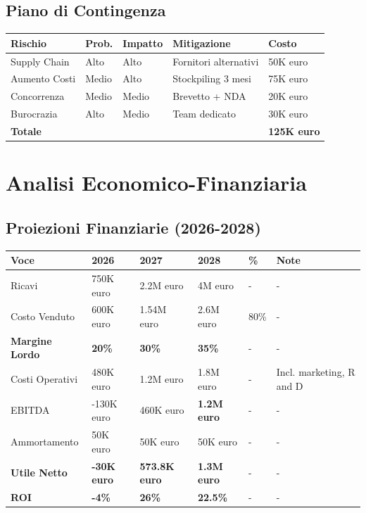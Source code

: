 \documentclass[11pt,a4paper]{report}
\begin{document}
\section{Piano di Contingenza}
\begin{longtable}{|L{3cm}|C{1.5cm}|C{1.5cm}|L{3.5cm}|C{1.5cm}|}
\hline
{\bf Rischio} & {\bf Prob.} & {\bf Impatto} & {\bf Mitigazione} & {\bf Costo} \\ \hline
Supply Chain & Alto & Alto & Fornitori alternativi & 50K euro \\
Aumento Costi & Medio & Alto & Stockpiling 3 mesi & 75K euro \\
Concorrenza & Medio & Medio & Brevetto + NDA & 20K euro \\
Burocrazia & Alto & Medio & Team dedicato & 30K euro \\ \hline
{\bf Totale} & & & & {\bf 125K euro} \\ \hline
\end{longtable}

\chapter{Analisi Economico-Finanziaria}
\label{ch:financial}

\section{Proiezioni Finanziarie (2026-2028)}
\begin{longtable}{|L{2.5cm}|C{1.5cm}|C{1.5cm}|C{1.5cm}|C{1.5cm}|C{1.5cm}|}
\hline
{\bf Voce} & {\bf 2026} & {\bf 2027} & {\bf 2028} & {\bf \%} & {\bf Note} \\ \hline
Ricavi & 750K euro & 2.2M euro & 4M euro & - & - \\
Costo Venduto & 600K euro & 1.54M euro & 2.6M euro & 80\% & - \\
{\bf Margine Lordo} & {\bf 20\%} & {\bf 30\%} & {\bf 35\%} & - & - \\
Costi Operativi & 480K euro & 1.2M euro & 1.8M euro & - & Incl. marketing, R and D \\
EBITDA & -130K euro & 460K euro & {\bf 1.2M euro} & - & - \\
Ammortamento & 50K euro & 50K euro & 50K euro & - & - \\
{\bf Utile Netto} & {\bf -30K euro} & {\bf 573.8K euro} & {\bf 1.3M euro} & - & - \\
{\bf ROI} & {\bf -4\%} & {\bf 26\%} & {\bf 22.5\%} & - & - \\ \hline
\end{longtable}
\end{document}
